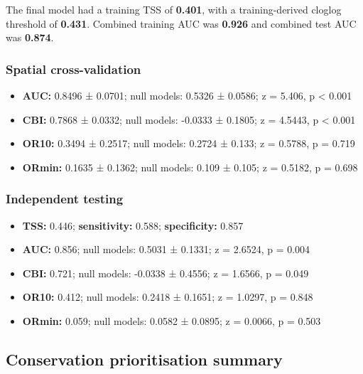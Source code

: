 \documentclass[
  openany]{book}
\providecommand{\tightlist}{%
  \setlength{\itemsep}{0pt}\setlength{\parskip}{0pt}}
\providecommand{\tightlist}{%
  \setlength{\itemsep}{0pt}%
  \setlength{\parskip}{0pt}%
}
\begin{document}
The final model had a training TSS of \textbf{0.401}, with a training-derived cloglog threshold of \textbf{0.431}. Combined training AUC was \textbf{0.926} and combined test AUC was \textbf{0.874}.

\subsubsection*{Spatial cross-validation}\label{spatial-cross-validation-12}

\begin{itemize}
\tightlist
\item
  \textbf{AUC:} 0.8496 ± 0.0701; null models: 0.5326 ± 0.0586; z = 5.406, p \textless{} 0.001
\item
  \textbf{CBI:} 0.7868 ± 0.0332; null models: -0.0333 ± 0.1805; z = 4.5443, p \textless{} 0.001
\item
  \textbf{OR10:} 0.3494 ± 0.2517; null models: 0.2724 ± 0.133; z = 0.5788, p = 0.719
\item
  \textbf{ORmin:} 0.1635 ± 0.1362; null models: 0.109 ± 0.105; z = 0.5182, p = 0.698
\end{itemize}

\subsubsection*{Independent testing}\label{independent-testing-12}

\begin{itemize}
\tightlist
\item
  \textbf{TSS:} 0.446; \textbf{sensitivity:} 0.588; \textbf{specificity:} 0.857
\item
  \textbf{AUC:} 0.856; null models: 0.5031 ± 0.1331; z = 2.6524, p = 0.004
\item
  \textbf{CBI:} 0.721; null models: -0.0338 ± 0.4556; z = 1.6566, p = 0.049
\item
  \textbf{OR10:} 0.412; null models: 0.2418 ± 0.1651; z = 1.0297, p = 0.848
\item
  \textbf{ORmin:} 0.059; null models: 0.0582 ± 0.0895; z = 0.0066, p = 0.503
\end{itemize}

\subsection*{Conservation prioritisation summary}\label{conservation-prioritisation-summary-12}
\end{document}
